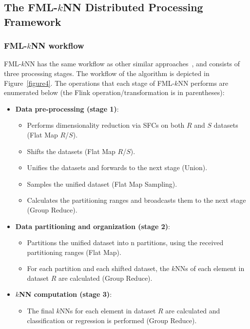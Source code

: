 \subsection{The FML-\texorpdfstring{$k$}NNN Distributed Processing Framework}
\subsubsection{FML-\texorpdfstring{$k$}NNN workflow}
FML-$k$NN has the same workflow as other similar approaches~\cite{song2015hal}, and consists of three processing stages. The workflow of the algorithm is depicted in Figure~\ref{figure4}. The operations that each stage of FML-$k$NN performs are enumerated below (the Flink operation/transformation is in parentheses):

\begin{itemize}
	\item \textbf{Data pre-processing (stage 1)}:
	\begin{itemize}
		\item Performs dimensionality reduction via SFCs on both $R$ and $S$ datasets (Flat Map $R$/$S$).
		\item Shifts the datasets (Flat Map $R$/$S$).
		\item Unifies the datasets and forwards to the next stage (Union).
		\item Samples the unified dataset (Flat Map Sampling).
		\item Calculates the partitioning ranges and broadcasts them to the next stage (Group Reduce).
	\end{itemize}
	\item \textbf{Data partitioning and organization (stage 2)}:
	\begin{itemize}
		\item Partitions the unified dataset into n partitions, using the received partitioning ranges (Flat Map).
		\item For each partition and each shifted dataset, the $k$NNs of each element in dataset $R$ are calculated (Group Reduce).
	\end{itemize}
	\item \textbf{$k$NN computation (stage 3)}:
	\begin{itemize}
		\item The final $k$NNs for each element in dataset $R$ are calculated and classification or regression is performed (Group Reduce).
	\end{itemize}
\end{itemize}

